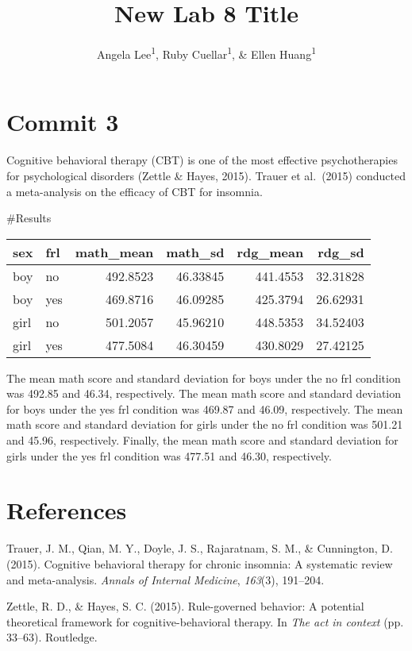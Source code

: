 \documentclass[man]{apa6}
\title{New Lab 8 Title}
\author{Angela Lee\textsuperscript{1}, Ruby Cuellar\textsuperscript{1}, \& Ellen Huang\textsuperscript{1}}
\date{}
\affiliation{
\vspace{0.5cm}
\textsuperscript{1} University of Oregon}
\begin{document}
\maketitle

\hypertarget{commit-3}{%
\section{Commit 3}\label{commit-3}}

Cognitive behavioral therapy (CBT) is one of the most effective psychotherapies for psychological disorders (Zettle \& Hayes, 2015). Trauer et al.~(2015) conducted a meta-analysis on the efficacy of CBT for insomnia.

\#Results

\begin{table}[H]
\centering
\begin{tabular}{l|l|r|r|r|r}
\hline
sex & frl & math\_mean & math\_sd & rdg\_mean & rdg\_sd\\
\hline
boy & no & 492.8523 & 46.33845 & 441.4553 & 32.31828\\
\hline
boy & yes & 469.8716 & 46.09285 & 425.3794 & 26.62931\\
\hline
girl & no & 501.2057 & 45.96210 & 448.5353 & 34.52403\\
\hline
girl & yes & 477.5084 & 46.30459 & 430.8029 & 27.42125\\
\hline
\end{tabular}
\end{table}

The mean math score and standard deviation for boys under the no frl condition was 492.85 and 46.34, respectively. The mean math score and standard deviation for boys under the yes frl condition was 469.87 and 46.09, respectively. The mean math score and standard deviation for girls under the no frl condition was 501.21 and 45.96, respectively. Finally, the mean math score and standard deviation for girls under the yes frl condition was 477.51 and 46.30, respectively.

\newpage

\hypertarget{references}{%
\section{References}\label{references}}

\begingroup
\setlength{\parindent}{-0.5in}
\setlength{\leftskip}{0.5in}

\hypertarget{refs}{}
\leavevmode\hypertarget{ref-trauer2015CBT}{}%
Trauer, J. M., Qian, M. Y., Doyle, J. S., Rajaratnam, S. M., \& Cunnington, D. (2015). Cognitive behavioral therapy for chronic insomnia: A systematic review and meta-analysis. \emph{Annals of Internal Medicine}, \emph{163}(3), 191--204.

\leavevmode\hypertarget{ref-zettle2015}{}%
Zettle, R. D., \& Hayes, S. C. (2015). Rule-governed behavior: A potential theoretical framework for cognitive-behavioral therapy. In \emph{The act in context} (pp. 33--63). Routledge.

\endgroup
\end{document}
